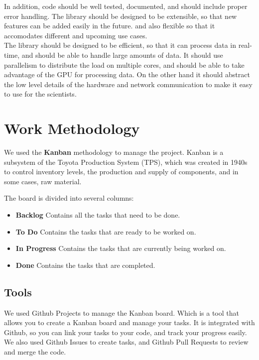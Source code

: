 \begin{spacing}{1.2}
    In addition, code should be well tested, documented, and should include proper error handling.
    The library should be designed to be extensible, so that new features can be added easily in the future.
    and also flexible so that it accomodates different and upcoming use cases. \\

    The library should be designed to be efficient, so that it can process data in real-time, and should be able to handle
    large amounts of data. It should use parallelism to distribute the load on multiple cores, and should be able to
    take advantage of the GPU for processing data. On the other hand it should abstract the low level details of the
    hardware and network communication to make it easy to use for the scientists.




    \section{Work Methodology}
    We used the \textbf{Kanban} methodology to manage the project. Kanban is a subsystem of the Toyota Production System (TPS),
    which was created in 1940s to control inventory levels, the production and
    supply of components, and in some cases, raw material. \cite{junior2010variations}

    The board is divided into several columns:
    \begin{itemize}
        \item \textbf{Backlog} Contains all the tasks that need to be done.
        \item \textbf{To Do} Contains the tasks that are ready to be worked on.
        \item \textbf{In Progress} Contains the tasks that are currently being worked on.
        \item \textbf{Done} Contains the tasks that are completed.
    \end{itemize}

    \subsection{Tools}
    We used Github Projects to manage the Kanban board. Which is a tool that allows you to create a Kanban board
    and manage your tasks. It is integrated with Github, so you can link your tasks to your code, and track your progress
    easily. We also used Github Issues to create tasks, and Github Pull Requests to review and merge the code.


\end{spacing}
